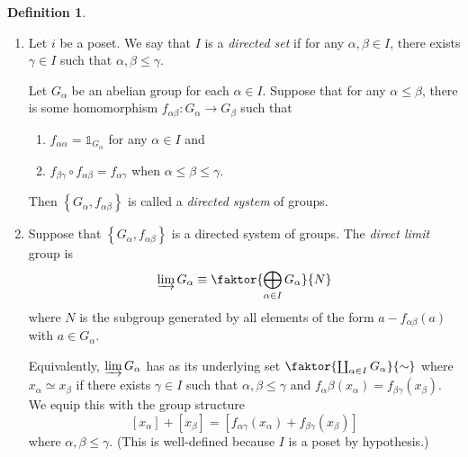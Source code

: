 \documentclass[10pt,letterpaper,cm]{nupset}
\theoremstyle{definition}
\newtheorem{definition}{Definition}[subsection]
\theoremstyle{theorem}
\theoremstyle{remark}
\newcommand{\1}{\mathbb{1}}
\newcommand{\0}{\vec 0}
\begin{document}
\begin{definition} $ $
\begin{enumerate}
\item Let $i$ be a poset. We say that $I$ is a \textit{directed set} if for any $\alpha, \beta \in I$, there exists $\gamma \in I$ such that $\alpha, \beta \leq \gamma$. 

Let $G_{\alpha}$ be an abelian group for each $\alpha \in I$. Suppose that for any $\alpha \leq \beta$, there is some homomorphism $f_{\alpha{\beta}} : G_{\alpha} \to G_{\beta}$ such that 
\begin{enumerate}[label=(\roman*)]
\item $f_{\alpha{\alpha}} = \1_{G_{\alpha}}$ for any $\alpha \in I$ and 
\item $f_{\beta{\gamma}}\circ f_{\alpha{\beta}} = f_{\alpha{\gamma}}$ when $\alpha \leq \beta \leq \gamma$. 
\end{enumerate}
Then $\left\{G_{\alpha}, f_{\alpha{\beta}}\right\}$ is called a \textit{directed system} of groups. 
\item Suppose that $\left\{G_{\alpha},  f_{\alpha{\beta}}\right\}$ is a directed system of groups. The \textit{direct limit} group is $$\varinjlim G_{\alpha} \equiv \faktor{\bigoplus_{\alpha \in I}G_{\alpha}}{N}$$ where $N$ is the subgroup generated by all elements of the form $a-f_{\alpha{\beta}}(a)$ with $a\in G_{\alpha}$. 

Equivalently, $\varinjlim G_{\alpha}$ has as its underlying set $\faktor{\coprod_{\alpha \in I} G_{\alpha}}{\sim}$ where $x_{\alpha} \simeq x_{\beta}$ if there exists $\gamma \in I$ such that $\alpha, \beta \leq \gamma$ and $f_{\alpha}{\beta}(x_{\alpha}) = f_{\beta{\gamma}}(x_{\beta})$. We equip this with the group structure $$\left[x_{\alpha}\right] +\left[x_{\beta}\right] = \left[f_{\alpha{\gamma}}(x_{\alpha}) + f_{\beta{\gamma}}(x_{\beta})\right]$$ where $\alpha, \beta \leq \gamma$. (This is well-defined because $I$ is a poset by hypothesis.)
\end{enumerate}
\end{definition}
\end{document}
